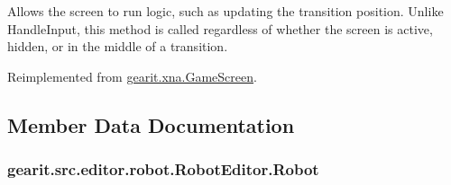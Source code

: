 Allows the screen to run logic, such as updating the transition position. Unlike Handle\+Input, this method is called regardless of whether the screen is active, hidden, or in the middle of a transition. 



Reimplemented from \hyperlink{classgearit_1_1xna_1_1_game_screen_a6bb803502dfbd62b275c2a21d182f88e}{gearit.\+xna.\+Game\+Screen}.



\subsection{Member Data Documentation}
\hypertarget{classgearit_1_1src_1_1editor_1_1robot_1_1_robot_editor_a0a0b225248498a5715f672b5d78f8437}{
\subsubsection[{Robot}]{ gearit.\+src.\+editor.\+robot.\+Robot\+Editor.\+Robot}}\label{classgearit_1_1src_1_1editor_1_1robot_1_1_robot_editor_a0a0b225248498a5715f672b5d78f8437}


